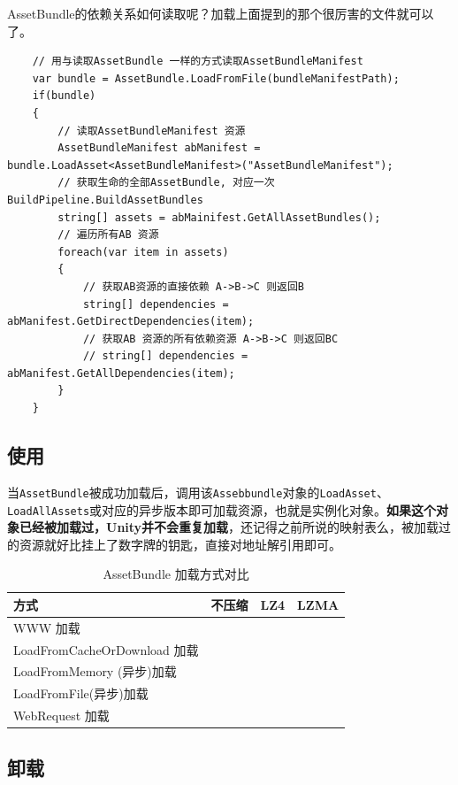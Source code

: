 \documentclass[UTF8,a4paper,12pt]{ctexbook}
\begin{document}
			AssetBundle的依赖关系如何读取呢？加载上面提到的那个很厉害的文件就可以了。
				\begin{lstlisting}
	// 用与读取AssetBundle 一样的方式读取AssetBundleManifest
	var bundle = AssetBundle.LoadFromFile(bundleManifestPath);
	if(bundle)
	{
		// 读取AssetBundleManifest 资源
		AssetBundleManifest abManifest = bundle.LoadAsset<AssetBundleManifest>("AssetBundleManifest");
		// 获取生命的全部AssetBundle, 对应一次BuildPipeline.BuildAssetBundles
		string[] assets = abMainifest.GetAllAssetBundles();
		// 遍历所有AB 资源
		foreach(var item in assets)
		{
			// 获取AB资源的直接依赖 A->B->C 则返回B
			string[] dependencies = abManifest.GetDirectDependencies(item);
			// 获取AB 资源的所有依赖资源 A->B->C 则返回BC
			// string[] dependencies = abManifest.GetAllDependencies(item);
		}
	}
				\end{lstlisting}
		\subsection{使用}
			当\verb|AssetBundle|被成功加载后，调用该\verb|Assebbundle|对象的\verb|LoadAsset|、\verb|LoadAllAssets|或对应的异步版本即可加载资源，也就是实例化对象。\textbf{如果这个对象已经被加载过，Unity并不会重复加载}，还记得之前所说的映射表么，被加载过的资源就好比挂上了数字牌的钥匙，直接对地址解引用即可。
			
			\begin{table}
				\centering
				\caption{AssetBundle 加载方式对比}
				\begin{tabular}{p{5cm}<{\centering}|p{3cm}<{\centering}|p{3cm}<{\centering}|p{3cm}<{\centering}}
					\toprule
						方式 & 不压缩 & LZ4 & LZMA\\
					\midrule
						WWW 加载 & & & \\
						LoadFromCacheOrDownload 加载 & & & \\
						LoadFromMemory (异步)加载 & & & \\
						LoadFromFile(异步)加载 & & & \\
						WebRequest 加载 & & & \\
					\bottomrule
				\end{tabular}
			\end{table}
		\subsection{卸载}
		
\end{document}
